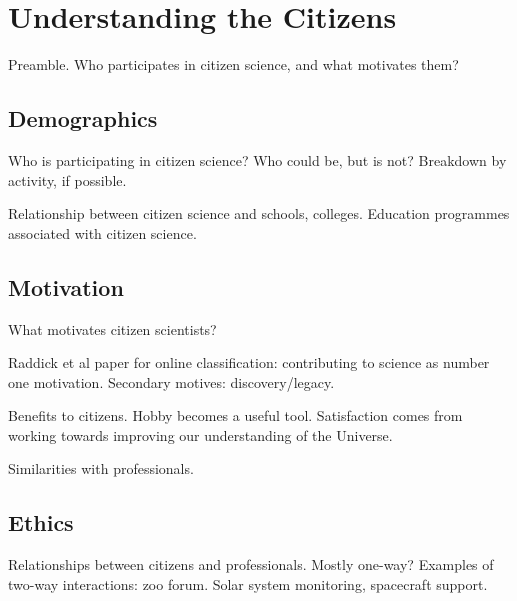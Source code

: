 \documentclass{ar2e}
\begin{document}

\section{Understanding the Citizens}
\label{sec:crowd}

Preamble. Who participates in citizen science, and what motivates them?


\subsection{Demographics}
\label{sec:crowd:demographics}

Who is participating in citizen science? Who could be, but is not?
Breakdown by activity, if possible.

Relationship between citizen science and schools, colleges. Education programmes
associated with citizen science.


\subsection{Motivation}
\label{sec:crowd:motive}

What motivates citizen scientists?

Raddick et al paper for online classification: contributing to science as number
one motivation. Secondary motives: discovery/legacy.

Benefits to citizens.  Hobby becomes a useful tool. Satisfaction comes from
working towards improving our understanding of the Universe.

Similarities with professionals. 


\subsection{Ethics}
\label{sec:crowd:ethics}

Relationships between citizens and professionals. Mostly one-way? Examples of
two-way interactions: zoo forum. Solar system monitoring, spacecraft support.
\end{document}
